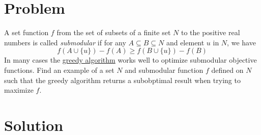 \documentclass[11pt,a4paper]{report}
\theoremstyle{plain}
\theoremstyle{definition}
\theoremstyle{remark}
\begin{document}
\section*{Problem}
A  set function $f$ from the set of subsets of a finite set $N$ to the positive real numbers is called \emph{submodular} if for any $A\subseteq B \subseteq N$ and element $u$ in $N$, we have
$$f(A \cup \{u\}) - f(A)  \geq f(B \cup \{u\}) - f(B)$$
In many cases the \href{https://en.wikipedia.org/wiki/Greedy_algorithm}{greedy algorithm} works well to optimize submodular objective functions.  Find an example of a set $N$ and submodular function $f$ defined on $N$ such that the greedy algorithm returns a subobptimal result when trying to maximize $f$.


\section*{Solution}
\end{document}
